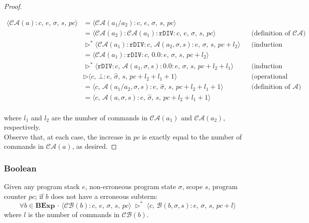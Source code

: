 \documentclass{article}
\begin{document}
\begin{proof}
\begin{itemize}
\begin{itemize}
            \[
              \begin{aligned}
                \langle  \mathcal{CA}(a) : c,\, e,\, \sigma,\, s,\, pc \rangle 
                &= \langle \mathcal{CA}(a_1 / a_2) : c,\, e,\, \sigma,\, s,\, pc \rangle \\
                &= \langle \mathcal{CA}(a_2) : \mathcal{CA}(a_1) : \texttt{rDIV} :  c,\, e,\, \sigma,\, s,\, pc \rangle 
                && \text{(definition of } \mathcal{CA}\text{)} \\
                &\triangleright^{\ast} \langle \mathcal{CA}(a_1) : \texttt{rDIV} :  c,\, \mathcal{A}(a_2, \sigma, s) : e,\, \sigma,\, s,\, pc + l_2 \rangle 
                && \text{(induction hypothesis 2)} \\
                &= \langle \mathcal{CA}(a_1) : \texttt{rDIV} :  c,\, 0.0 : e,\, \sigma,\, s,\, pc + l_2 \rangle \\
                &\triangleright^{\ast} \langle \texttt{rDIV} :  c,\, \mathcal{A}(a_1, \sigma, s) : 0.0 : e,\, \sigma,\, s,\, pc + l_2 + l_1 \rangle 
                && \text{(induction hypothesis 1)} \\
                &\triangleright \langle c,\, \bot : e,\, \hat{\sigma},\, s,\, pc + l_2 + l_1 + 1 \rangle 
                && \text{(operational semantics)} \\
                &= \langle c,\, \mathcal{A}(a_1 / a_2, \sigma, s) : e,\, \hat{\sigma},\, s,\, pc + l_2 + l_1 + 1 \rangle
                && \text{(definition of } \mathcal{A}\text{)} \\
                &= \langle c,\, \mathcal{A}(a, \sigma, s) : e,\, \hat{\sigma},\, s,\, pc + l_2 + l_1 + 1 \rangle \\
              \end{aligned}
          \]
            
        \end{itemize}    
\end{itemize}

where $l_1$ and $l_2$ are the number of commands in $\mathcal{CA}(a_1)$ and $\mathcal{CA}(a_2)$, respectively.\\
Observe that, at each case, the increase in $pc$ is exactly equal to the number of commands in $\mathcal{CA}(a)$, as desired.

\end{proof}

\subsubsection{Boolean}
Given any program stack $e$, non-erroneous program state $\sigma$, scope $s$, program counter $pc$; if $b$ does not have a erroneous subterm:
\[
\forall b \in \textbf{BExp} \,\cdot\, \langle \mathcal{CB}(b) : c,\, e,\, \sigma,\, s,\, pc \rangle \; \triangleright^{\ast} \;
\langle c,\, \mathcal{B}(b, \sigma, s) : e,\, \sigma,\, s,\, pc + l \rangle
\] where $l$ is the number of commands in $\mathcal{CB}(b)$.
\end{document}

